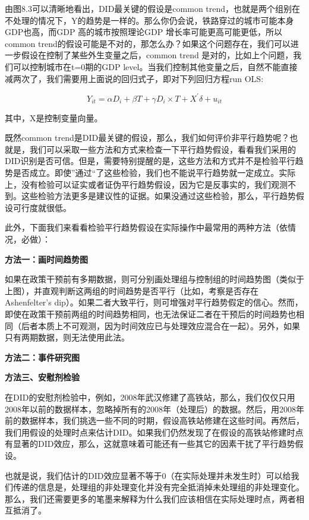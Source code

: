 \documentclass[cn,12pt,math=newtx,citestyle=gb7714-2015,bibstyle=gb7714-2015]{elegantbook}
\begin{document}
	由图8.3可以清晰地看出，DID最关键的假设是common trend，也就是两个组别在不处理的情况下，Y的趋势是一样的。那么你仍会说，铁路穿过的城市可能本身GDP也高，而GDP 高的城市按照理论GDP 增长率可能更高可能更低，所以common trend的假设可能是不对的，那怎么办？如果这个问题存在，我们可以进一步假设在控制了某些外生变量之后，common trend 是对的，比如上个问题，我们可以控制城市在t=0期的GDP level。当我们控制其他变量之后，自然不能直接减两次了，我们需要用上面说的回归式子，即对下列回归方程run OLS:
	
	\begin{equation}
		Y_{it}=\alpha{D}_i+\beta{T}+\gamma{D_i\times{T}}+X^{'}\delta+u_{it}
	\end{equation}
	
	其中，X是控制变量向量。
	
	既然common trend是DID最关键的假设，那么，我们如何评价非平行趋势呢？也就是，我们可以采取一些方法和方式来检查一下平行趋势假设，看看我们采用的DID识别是否可信。但是，需要特别提醒的是，这些方法和方式并不是检验平行趋势是否成立。即使”通过“了这些检验，我们也不能说平行趋势就一定成立。实际上，没有检验可以证实或者证伪平行趋势假设，因为它是反事实的，我们观测不到。这些检验方法更多是建议性的证据。如果没通过这些检验，那么，平行趋势假设可行度就很低。
	
	此外，下面我们来看看检验平行趋势假设在实际操作中最常用的两种方法（依情况，必做）：
	
	\textbf{方法一：画时间趋势图}
	
	如果在政策干预前有多期数据，则可分别画处理组与控制组的时间趋势图（类似于上图），并直观判断这两组的时间趋势是否平行（比如，考察是否存在Ashenfelter's dip）。如果二者大致平行，则可增强对平行趋势假定的信心。然而，即使在政策干预前两组的时间趋势相同，也无法保证二者在干预后的时间趋势也相同（后者本质上不可观测，因为时间效应已与处理效应混合在一起）。另外，如果只有两期数据，则无法使用此法。
	
	\textbf{方法二：事件研究图}
		
	
	\textbf{方法三、安慰剂检验}
	
	在DID的安慰剂检验中，例如，2008年武汉修建了高铁站，那么，我们仅仅只用2008年以前的数据样本，忽略掉所有的2008年（处理后）的数据。然后，用2008年前的数据样本，我们挑选一些不同的时期，假设高铁站修建在这些时间。再然后，我们用假设的处理时点来估计DID。如果我们仍然发现了在假设的高铁站修建时点有显著的DID效应，那么，这就意味着可能还有一些其它的因素干扰了平行趋势假设。
	
	也就是说，我们估计的DID效应显著不等于0（在实际处理并未发生时）可以给我们传递的信息是，处理组的非处理变化并没有完全抵消掉未处理组的非处理变化。那么，我们还需要更多的笔墨来解释为什么我们应该相信在实际处理时点，两者相互抵消了。
	
\end{document}

